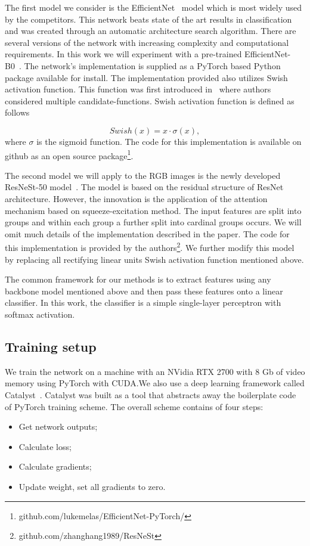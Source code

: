 \documentclass[letterpaper]{article}
\begin{document}
The first model we consider is the EfficientNet~\cite{tan2019efficientnet} model which is most widely used by the competitors.
This network beats state of the art results in classification and was created through an automatic architecture search algorithm. There are several versions of the network with increasing complexity and computational requirements. In this work we will experiment with a pre-trained EfficientNet-B0~\cite{tan2019efficientnet}. The network's implementation is supplied as a PyTorch based Python package available for install. The implementation provided also utilizes Swish activation function. This function was first introduced in~\cite{ramachandran2017searching} where authors considered multiple candidate-functions. Swish activation function is defined as follows

\[ Swish(x) = x\cdot \sigma(x), \]
where \( \sigma  \) is the sigmoid function. The code for this implementation is available on github as an open source package\footnote{github.com/lukemelas/EfficientNet-PyTorch/}.

The second model we will apply to the RGB images is the newly developed ResNeSt-50 model~\cite{zhang2020resnest}. The model is based on the residual structure of ResNet~\cite{he2016deep} architecture. However, the innovation is the application of the attention mechanism based on squeeze-excitation method. The input features are split into groups and within each group a further split into cardinal groups occurs. We will omit much details of the implementation described in the paper. The code for this implementation is provided by the authors\footnote{github.com/zhanghang1989/ResNeSt}. We further modify this model by replacing all rectifying linear units Swish activation function mentioned above.

The common framework for our methods is to extract features using any backbone model mentioned above and then pass these features onto a linear classifier. In this work, the classifier is a simple single-layer perceptron with softmax activation.

\subsection{Training setup}
We train the network on a machine with an NVidia RTX 2700 with 8 Gb of video memory using PyTorch with CUDA.\@ We also use a deep learning framework called Catalyst~\cite{catalyst}. Catalyst was built as a tool that abstracts away the boilerplate code of PyTorch training scheme. The overall scheme contains of four steps:
\begin{itemize}
    \item Get network outputs;
    \item Calculate loss;
    \item Calculate gradients;
    \item Update weight, set all gradients to zero.
\end{itemize}
\end{document}
